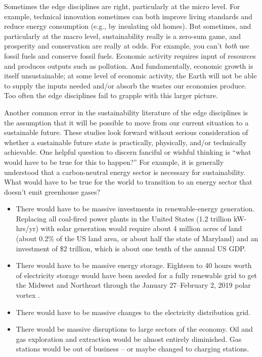 \documentclass[12pt]{article}
\begin{document}
Sometimes the edge disciplines are right, particularly at the micro level.
For example, technical innovation sometimes can both 
improve living standards and reduce energy consumption
(e.g., by insulating old homes).
But sometimes, and particularly at the macro level,
sustainability really is a zero-sum game, and 
prosperity and conservation are really at odds.
For example, you can't \emph{both} use fossil fuels and conserve fossil fuels.
Economic activity requires input of resources
and produces outputs such as pollution. 
And fundamentally, economic growth is itself unsustainable; 
at some level of economic activity,
the Earth will not be able to supply the inputs needed and/or 
absorb the wastes our economies produce.
Too often the edge disciplines fail to grapple with this larger picture.

Another common error in the sustainability literature of the edge disciplines
is the assumption that it will be possible to move 
from our current situation to a sustainable future. 
These studies look forward without
serious consideration of whether a sustainable future state 
is practically, physically, and/or technically achievable. 
One helpful question to discern fanciful or wishful thinking
is ``what would have to be true for this to happen?''
For example, it is generally understood that a carbon-neutral 
energy sector is necessary for sustainability.
What would have to be true for the world to transition to an energy sector 
that doesn't emit greenhouse gases?
%
\begin{itemize}

  \item There would have to be massive investments in renewable-energy generation. 
        Replacing all coal-fired power plants in the United States (1.2 trillion kW-hrs/yr) %
        with solar generation would require about 4 million acres of land 
        (about 0.2\% of the US land area, or about half the state of Maryland) 
        and an investment of \$2 trillion, which is about one tenth of the annual US GDP. 

  \item There would have to be massive energy storage. 
        Eighteen to 40 hours worth of electricity storage would 
        have been needed for a fully renewable grid to get the Midwest and Northeast 
		through the January 27--February 2, 2019 polar vortex \cite{wood2019}.
		
  \item There would have to be massive changes to the electricity distribution grid.
  
  \item There would be massive disruptions to large sectors of the economy. 
        Oil and gas exploration and extraction would be almost entirely diminished.
		Gas stations would be out of business -- or maybe changed to charging stations.

\end{itemize}
\end{document}
